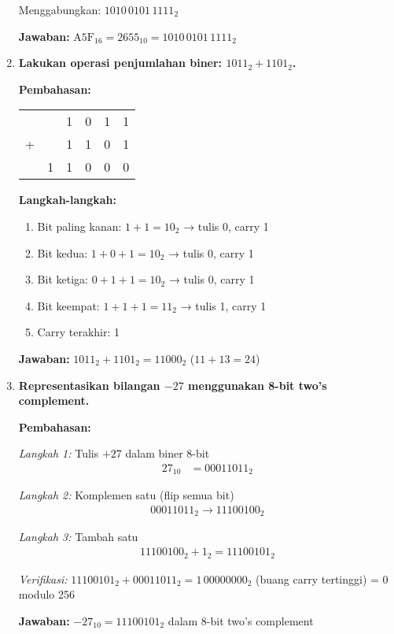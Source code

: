 \begin{enumerate}
    Menggabungkan: \(1010\,0101\,1111_2\)
    
    \textbf{Jawaban:} \(\mathrm{A5F}_{16} = 2655_{10} = 1010\,0101\,1111_2\)

    \item \textbf{Lakukan operasi penjumlahan biner: \(1011_2 + 1101_2\).}
    
    \textbf{Pembahasan:}
    
    \begin{center}
    \begin{tabular}{cccccc}
      &   & 1 & 0 & 1 & 1 \\
    + &   & 1 & 1 & 0 & 1 \\
    \hline
      & 1 & 1 & 0 & 0 & 0 \\
    \end{tabular}
    \end{center}
    
    \textbf{Langkah-langkah:}
    \begin{enumerate}
        \item Bit paling kanan: \(1 + 1 = 10_2\) → tulis 0, carry 1
        \item Bit kedua: \(1 + 0 + 1 = 10_2\) → tulis 0, carry 1
        \item Bit ketiga: \(0 + 1 + 1 = 10_2\) → tulis 0, carry 1
        \item Bit keempat: \(1 + 1 + 1 = 11_2\) → tulis 1, carry 1
        \item Carry terakhir: 1
    \end{enumerate}
    
    \textbf{Jawaban:} \(1011_2 + 1101_2 = 11000_2\) (\(11 + 13 = 24\))

    \item \textbf{Representasikan bilangan \(-27\) menggunakan 8-bit two's complement.}
    
    \textbf{Pembahasan:}
    
    \textit{Langkah 1:} Tulis \(+27\) dalam biner 8-bit
    \begin{align*}
    27_{10} &= 00011011_2
    \end{align*}
    
    \textit{Langkah 2:} Komplemen satu (flip semua bit)
    \begin{align*}
    00011011_2 \rightarrow 11100100_2
    \end{align*}
    
    \textit{Langkah 3:} Tambah satu
    \begin{align*}
    11100100_2 + 1_2 = 11100101_2
    \end{align*}
    
    \textit{Verifikasi:} \(11100101_2 + 00011011_2 = 1\,00000000_2\) (buang carry tertinggi) = \(0\) modulo 256
    
    \textbf{Jawaban:} \(-27_{10} = 11100101_2\) dalam 8-bit two's complement
\end{enumerate}

